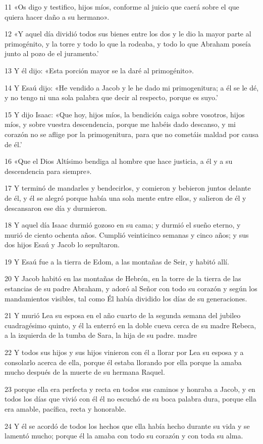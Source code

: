 \par 11 «Os digo y testifico, hijos míos, conforme al juicio que caerá sobre el que quiera hacer daño a su hermano».
\par 12 «Y aquel día dividió todos sus bienes entre los dos y le dio la mayor parte al primogénito, y la torre y todo lo que la rodeaba, y todo lo que Abraham poseía junto al pozo de el juramento.'
\par 13 Y él dijo: «Esta porción mayor se la daré al primogénito».
\par 14 Y Esaú dijo: «He vendido a Jacob y le he dado mi primogenitura; a él se le dé, y no tengo ni una sola palabra que decir al respecto, porque es suyo.'
\par 15 Y dijo Isaac: «Que hoy, hijos míos, la bendición caiga sobre vosotros, hijos míos, y sobre vuestra descendencia, porque me habéis dado descanso, y mi corazón no se aflige por la primogenitura, para que no cometáis maldad por causa de él.'
\par 16 «Que el Dios Altísimo bendiga al hombre que hace justicia, a él y a su descendencia para siempre».
\par 17 Y terminó de mandarles y bendecirlos, y comieron y bebieron juntos delante de él, y él se alegró porque había una sola mente entre ellos, y salieron de él y descansaron ese día y durmieron.
\par 18 Y aquel día Isaac durmió gozoso en su cama; y durmió el sueño eterno, y murió de ciento ochenta años. Cumplió veinticinco semanas y cinco años; y sus dos hijos Esaú y Jacob lo sepultaron.
\par 19 Y Esaú fue a la tierra de Edom, a las montañas de Seir, y habitó allí.
\par 20 Y Jacob habitó en las montañas de Hebrón, en la torre de la tierra de las estancias de su padre Abraham, y adoró al Señor con todo su corazón y según los mandamientos visibles, tal como Él había dividido los días de su generaciones.
\par 21 Y murió Lea su esposa en el año cuarto de la segunda semana del jubileo cuadragésimo quinto, y él la enterró en la doble cueva cerca de su madre Rebeca, a la izquierda de la tumba de Sara, la hija de su padre. madre
\par 22 Y todos sus hijos y sus hijos vinieron con él a llorar por Lea su esposa y a consolarlo acerca de ella, porque él estaba llorando por ella porque la amaba mucho después de la muerte de su hermana Raquel.
\par 23 porque ella era perfecta y recta en todos sus caminos y honraba a Jacob, y en todos los días que vivió con él él no escuchó de su boca palabra dura, porque ella era amable, pacífica, recta y honorable.
\par 24 Y él se acordó de todos los hechos que ella había hecho durante su vida y se lamentó mucho; porque él la amaba con todo su corazón y con toda su alma.

